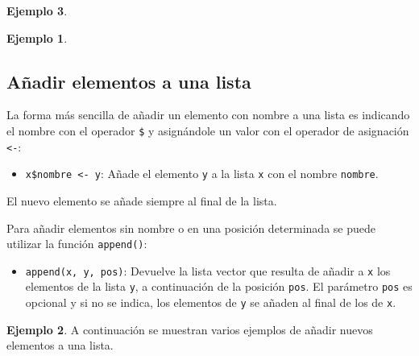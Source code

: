 \documentclass[
]{book}
\providecommand{\tightlist}{%
  \setlength{\itemsep}{0pt}\setlength{\parskip}{0pt}}
\theoremstyle{definition}
\theoremstyle{definition}
\newtheorem{example}{Ejemplo}[chapter]
\theoremstyle{definition}
\theoremstyle{definition}
\theoremstyle{remark}
\begin{document}
\begin{example}
\begin{example}
\end{example}

\hypertarget{auxf1adir-elementos-a-una-lista}{%
\subsection{Añadir elementos a una lista}\label{auxf1adir-elementos-a-una-lista}}

La forma más sencilla de añadir un elemento con nombre a una lista es indicando el nombre con el operador \texttt{\$} y asignándole un valor con el operador de asignación \texttt{\textless{}-}:

\begin{itemize}
\tightlist
\item
  \texttt{x\$nombre\ \textless{}-\ y}: Añade el elemento \texttt{y} a la lista \texttt{x} con el nombre \texttt{nombre}.
\end{itemize}

El nuevo elemento se añade siempre al final de la lista.

Para añadir elementos sin nombre o en una posición determinada se puede utilizar la función \texttt{append()}:

\begin{itemize}
\tightlist
\item
  \texttt{append(x,\ y,\ pos)}: Devuelve la lista vector que resulta de añadir a \texttt{x} los elementos de la lista \texttt{y}, a continuación de la posición \texttt{pos}. El parámetro \texttt{pos} es opcional y si no se indica, los elementos de \texttt{y} se añaden al final de los de \texttt{x}.
\end{itemize}

\begin{example}

A continuación se muestran varios ejemplos de añadir nuevos elementos a una lista.


\end{example}
\end{example}
\end{document}

